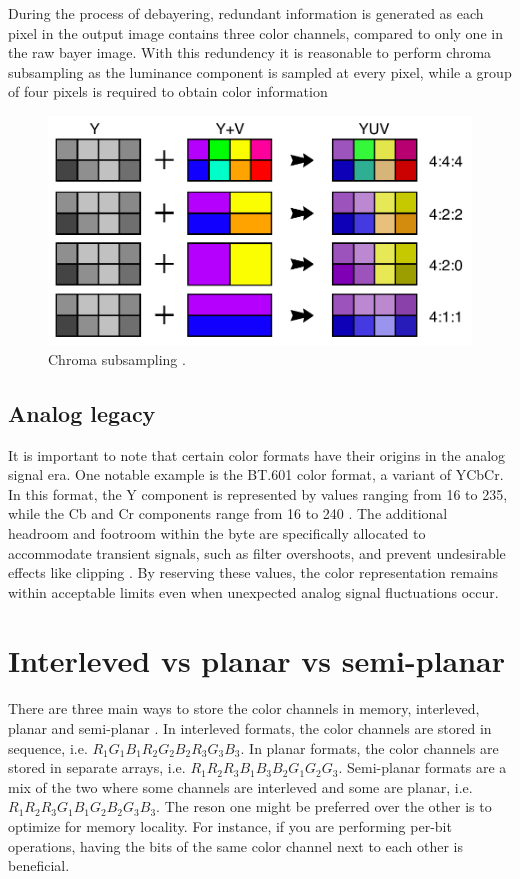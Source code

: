 During the process of debayering, redundant information is generated as each pixel in the output image contains three color channels, compared to only one in the raw bayer image.
With this redundency it is reasonable to perform chroma subsampling as the luminance component is sampled at every pixel, while a group of four pixels is required to obtain color information

\begin{figure}[H]
    \centering
    \includegraphics[width=.6\textwidth]{figures/debayer/chroma_subsampling.pdf}
    \caption{Chroma subsampling \cite{stevo-88EnglishMostWidely2010}.}
    \label{fig:chroma_subsampling}
\end{figure}


\subsection{Analog legacy}
It is important to note that certain color formats have their origins in the analog signal era.
One notable example is the BT.601 color format, a variant of YCbCr.
In this format, the Y component is represented by values ranging from 16 to 235, while the Cb and Cr components range from 16 to 240 \cite{YCbCr2023}.
The additional headroom and footroom within the byte are specifically allocated to accommodate transient signals, such as filter overshoots, and prevent undesirable effects like clipping \cite{Rec6012023}.
By reserving these values, the color representation remains within acceptable limits even when unexpected analog signal fluctuations occur.


\section{Interleved vs planar vs semi-planar}
There are three main ways to store the color channels in memory, interleved, planar and semi-planar \cite{baranYUVFormats2018}.
In interleved formats, the color channels are stored in sequence, i.e.
$R_1 G_1 B_1 R_2 G_2 B_2 R_3 G_3 B_3$.
In planar formats, the color channels are stored in separate arrays, i.e.
$R_1 R_2 R_3 B_1 B_3 B_2 G_1 G_2 G_3$.
Semi-planar formats are a mix of the two where some channels are interleved and some are planar, i.e.
$R_1 R_2 R_3 G_1 B_1 G_2 B_2 G_3 B_3$.
The reson one might be preferred over the other is to optimize for memory locality.
For instance, if you are performing per-bit operations, having the bits of the same color channel next to each other is beneficial.

